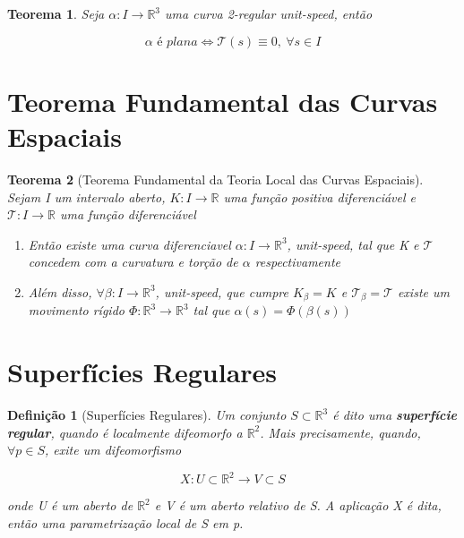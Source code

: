 \documentclass{article}
\newtheorem{theorem}{Teorema}
\newtheorem{definition}{Definição}
\begin{document}
\begin{theorem}
Seja $\alpha: I \rightarrow \mathbb{R}^3$ uma curva 2-regular \textit{unit-speed}, então

$$\alpha \textit{ é plana} \Longleftrightarrow \mathcal{T}(s) \equiv 0,\ \forall s \in I$$
\end{theorem}

\section*{Teorema Fundamental das Curvas Espaciais}
\label{s6}

\begin{theorem}[Teorema Fundamental da Teoria Local das Curvas Espaciais]
Sejam I um intervalo aberto, $K: I \rightarrow \mathbb{R}$ uma função positiva diferenciável e $\mathcal{T}: I \rightarrow \mathbb{R}$ uma função diferenciável

\begin{enumerate}
    \item Então existe uma curva diferenciavel $\alpha: I \rightarrow \mathbb{R}^3$, unit-speed, tal que K e $\mathcal{T}$ concedem com a curvatura e torção de $\alpha$ respectivamente
    
    \item Além disso, $\forall \beta: I \rightarrow \mathbb{R}^3$, unit-speed, que cumpre $K_\beta = K$ e $\mathcal{T}_\beta = \mathcal{T}$ existe um movimento rígido $\Phi: \mathbb{R}^3 \rightarrow \mathbb{R}^3$ tal que $\alpha(s) = \Phi(\beta(s))$ 
\end{enumerate}
\end{theorem}

\section*{Superfícies Regulares}
\label{s7}

\begin{definition}[Superfícies Regulares]
Um conjunto $S \subset \mathbb{R}^3$ é dito uma \textbf{superfície regular}, quando é localmente difeomorfo a $\mathbb{R}^2$. Mais precisamente, quando, $\forall p \in S$, exite um difeomorfismo

$$X: U \subset \mathbb{R}^2 \rightarrow V \subset S$$

onde U é um aberto de $\mathbb{R}^2$ e V é um aberto relativo de S. A aplicação X é dita, então uma parametrização local de S em p.
\end{definition}
\end{document}
